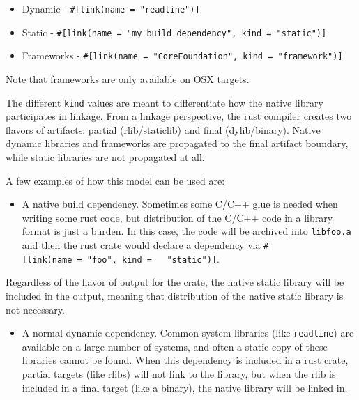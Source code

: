 \documentclass[a4paper,]{book}
\begin{document}
\begin{itemize}
\itemsep1pt\parskip0pt
\item
  Dynamic - \texttt{\#{[}link(name\ =\ "readline"){]}}
\item
  Static -
  \texttt{\#{[}link(name\ =\ "my\_build\_dependency",\ kind\ =\ "static"){]}}
\item
  Frameworks -
  \texttt{\#{[}link(name\ =\ "CoreFoundation",\ kind\ =\ "framework"){]}}
\end{itemize}

Note that frameworks are only available on OSX targets.

The different \texttt{kind} values are meant to differentiate how the
native library participates in linkage. From a linkage perspective, the
rust compiler creates two flavors of artifacts: partial (rlib/staticlib)
and final (dylib/binary). Native dynamic libraries and frameworks are
propagated to the final artifact boundary, while static libraries are
not propagated at all.

A few examples of how this model can be used are:

\begin{itemize}
\itemsep1pt\parskip0pt
\item
  A native build dependency. Sometimes some C/C++ glue is needed when
  writing some rust code, but distribution of the C/C++ code in a
  library format is just a burden. In this case, the code will be
  archived into \texttt{libfoo.a} and then the rust crate would declare
  a dependency via
  \texttt{\#{[}link(name\ =\ "foo",\ kind\ =\ \ \ "static"){]}}.
\end{itemize}

Regardless of the flavor of output for the crate, the native static
library will be included in the output, meaning that distribution of the
native static library is not necessary.

\begin{itemize}
\itemsep1pt\parskip0pt
\item
  A normal dynamic dependency. Common system libraries (like
  \texttt{readline}) are available on a large number of systems, and
  often a static copy of these libraries cannot be found. When this
  dependency is included in a rust crate, partial targets (like rlibs)
  will not link to the library, but when the rlib is included in a final
  target (like a binary), the native library will be linked in.
\end{itemize}
\end{document}
